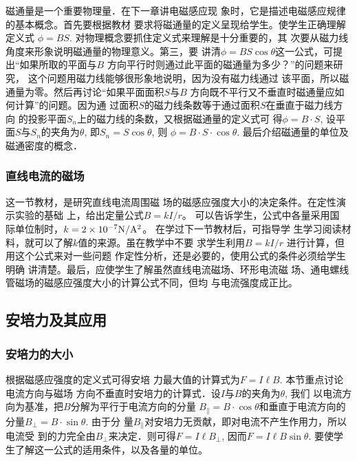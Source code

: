 磁通量是一个重要物理量．在下一章讲电磁感应现
象时，它是描述电磁感应规律的基本概念。首先要根据教材
要求将磁通量的定义呈现给学生。使学生正确理解定义式
$\phi=BS$. 对物理概念要抓住定义式来理解是十分重要的，其
次要从磁力线角度来形象说明磁通量的物理意义。第三，要
讲清$\phi=BS\cos\theta$这一公式，可提出“如果所取的平面与$B$
方向平行时则通过此平面的磁通量为多少？”的问题来研究，
这个问题用磁力线能够很形象地说明，因为没有磁力线通过
该平面，所以磁通量为零。然后再讨论“如果平面面积$S$与$B$
方向既不平行又不垂直时磁通量应如何计算”的问题。因为通
过面积$S$的磁力线条数等于通过面积$S$在垂直于磁力线方向
的投影平面$S_n$上的磁力线的条数，又根据磁通量的定义式可
得$\phi=B\cdot S$, 设平面$S$与$S_n$的夹角为$\theta$, 即$S_n=S\cos\theta$, 则
$\phi=B\cdot S\cdot\cos\theta$. 最后介绍磁通量的单位及磁通密度的概念．

\subsubsection{直线电流的磁场}

这一节教材，是研究直线电流周围磁
场的磁感应强度大小的决定条件。在定性演示实验的基础
上，给出定量公式$B=kI/r$。
可以告诉学生，公式中各量采用国
际单位制时，$k=2\times 10^{-7}{\rm N/A^2}$。
在学过下一节教材后，可指导学
生学习阅读材料，就可以了解$k$值的来源。虽在教学中不要
求学生利用$B=kI/r$
进行计算，但用这个公式来对一些问题
作定性分析，还是必要的，使用公式的条件必须给学生明确
讲清楚。最后，应使学生了解虽然直线电流磁场、环形电流磁
场、通电螺线管磁场的磁感应强度大小的计算公式不同，但均
与电流强度成正比。

\subsection{安培力及其应用}
\subsubsection{安培力的大小}

根据磁感应强度的定义式可得安培
力最大值的计算式为$F=I\ell B$. 本节重点讨论电流方向与磁场
方向不垂直时安培力的计算式．设$I$与$B$的夹角为$\theta$, 我们
以电流方向为基准，把$B$分解为平行于电流方向的分量
$B_{\parallel}=B\cdot\cos\theta$和垂直于电流方向的分量$B_{\bot}=B\cdot\sin\theta$. 由于分
量$B_{\parallel}$对安培力无贡献，即对电流不产生作用力，所以电流受
到的力完全由$B_{\bot}$来决定．则可得$F=I\ell B_{\bot}$, 因而$F=I\ell B\sin\theta$. 
要使学生了解这一公式的适用条件，以及各量的单位。

